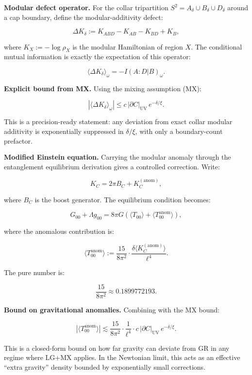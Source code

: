 \documentclass[
]{article}
\begin{document}
\textbf{Modular defect operator.} For the collar tripartition
\(S^2 = A_\delta \cup
B_\delta \cup D_\delta\) around a cap boundary, define the
modular-additivity defect:

\[
\Delta K_\delta := K_{ABD} - K_{AB} - K_{BD} + K_B,
\]

where \(K_X := -\log \rho_X\) is the modular Hamiltonian of region
\(X\). The conditional mutual information is exactly the expectation of
this operator:

\[
\langle \Delta K_\delta \rangle_\omega = -I(A:D|B)_\omega.
\]

\textbf{Explicit bound from MX.} Using the mixing assumption (MX):

\[
\left| \langle \Delta K_\delta \rangle_\omega \right|
\le c \, |\partial C|_{\mathrm{UV}} \, e^{-\delta/\xi}.
\]

This is a precision-ready statement: any deviation from exact collar
modular additivity is exponentially suppressed in \(\delta/\xi\), with
only a boundary-count prefactor.

\textbf{Modified Einstein equation.} Carrying the modular anomaly
through the entanglement equilibrium derivation gives a controlled
correction. Write:

\[
K_C = 2\pi B_C + K_C^{\mathrm{(anom)}},
\]

where \(B_C\) is the boost generator. The equilibrium condition becomes:

\[
G_{00} + \Lambda g_{00} = 8\pi G \left( \langle T_{00} \rangle
+ \langle T_{00}^{\mathrm{anom}} \rangle \right),
\]

where the anomalous contribution is:

\[
\langle T_{00}^{\mathrm{anom}} \rangle
:= \frac{15}{8\pi^2} \cdot \frac{\delta \langle K_C^{\mathrm{(anom)}} \rangle}{\ell^4}.
\]

The pure number is:

\[
\frac{15}{8\pi^2} \approx 0.1899772193.
\]

\textbf{Bound on gravitational anomalies.} Combining with the MX bound:

\[
\left| \langle T_{00}^{\mathrm{anom}} \rangle \right|
\lesssim \frac{15}{8\pi^2} \cdot \frac{1}{\ell^4} \cdot
c \, |\partial C|_{\mathrm{UV}} \, e^{-\delta/\xi}.
\]

This is a closed-form bound on how far gravity can deviate from GR in
any regime where LG+MX applies. In the Newtonian limit, this acts as an
effective ``extra gravity'' density bounded by exponentially small
corrections.
\end{document}
